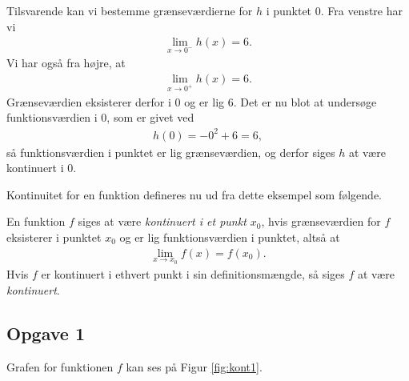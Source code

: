 \begin{exa}
	Tilsvarende kan vi bestemme grænseværdierne for $h$ i punktet $0$. Fra venstre har vi
	\begin{align*}
		\lim_{x \to 0^-} h(x) = 6.
	\end{align*}
	Vi har også fra højre, at 
	\begin{align*}
		\lim_{x \to 0^+} h(x) = 6.
	\end{align*}
	Grænseværdien eksisterer derfor i 0 og er lig 6. Det er nu blot at undersøge funktionsværdien i 0, som er givet ved
	\begin{align*}
		h(0) = -0^2 + 6 = 6,
	\end{align*}
	så funktionsværdien i punktet er lig grænseværdien, og derfor siges $h$ at være kontinuert i $0$. 
\end{exa}

Kontinuitet for en funktion defineres nu ud fra dette eksempel som følgende. 
\begin{defn}[Kontinuitet]
	En funktion $f$ siges at være \textit{kontinuert i et punkt $x_0$}, hvis grænseværdien for $f$ eksisterer i 
	punktet $x_0$ og er lig funktionsværdien i punktet, altså at
	\begin{align*}
		\lim_{x \to x_0} f(x) = f(x_0).
	\end{align*}	 
	Hvis $f$ er kontinuert i ethvert punkt i sin definitionsmængde, så siges $f$ at være \textit{kontinuert}.
\end{defn}



\newpage

\subsection*{Opgave 1}
Grafen for funktionen $f$ kan ses på Figur \ref{fig:kont1}.

